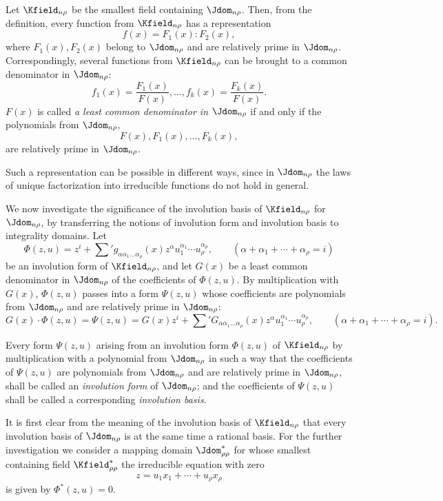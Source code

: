 \documentclass[11pt]{article}
\begin{document}
Let $\Kfield_{n\rho}$ be the smallest field containing $\Jdom_{n\rho}$. Then, from the definition, every function from $\Kfield_{n\rho}$ has a representation
\[
  f(x)=F_1(x):F_2(x),
\]
where $F_1(x),F_2(x)$ belong to $\Jdom_{n\rho}$ and are relatively prime in $\Jdom_{n\rho}$. Correspondingly, several functions from $\Kfield_{n\rho}$ can be brought to a common denominator in $\Jdom_{n\rho}$:
\[
  f_1(x)=\frac{F_1(x)}{F(x)},\ldots,
  f_k(x)=\frac{F_k(x)}{F(x)}.
\]
$F(x)$ is called \emph{a least common denominator in $\Jdom_{n\rho}$} if and only if the polynomials from $\Jdom_{n\rho}$,
\[
  F(x),F_1(x),\ldots,F_k(x),
\]
are relatively prime in $\Jdom_{n\rho}$.

Such a representation can be possible in different ways, since in $\Jdom_{n\rho}$ the laws of unique factorization into irreducible functions do not hold in general.

We now investigate the significance of the involution basis of $\Kfield_{n\rho}$ for $\Jdom_{n\rho}$, by transferring the notions of involution form and involution basis to integrality domains. Let
\[
  \Phi(z,u)=z^i+\sum{}' g_{\alpha\alpha_1\ldots\alpha_\rho}(x)
  z^\alpha u_1^{\alpha_1}\cdots u_\rho^{\alpha_\rho},
  \qquad
  (\alpha+\alpha_1+\cdots+\alpha_\rho=i)
\]
be an involution form of $\Kfield_{n\rho}$, and let $G(x)$ be a least common denominator in $\Jdom_{n\rho}$ of the coefficients of $\Phi(z,u)$. By multiplication with $G(x)$, $\Phi(z,u)$ passes into a form $\Psi(z,u)$ whose coefficients are polynomials from $\Jdom_{n\rho}$ and are relatively prime in $\Jdom_{n\rho}$:
\[
  G(x)\cdot\Phi(z,u)=\Psi(z,u)
  =G(x)z^i+
  \sum{}' G_{\alpha\alpha_1\ldots\alpha_\rho}(x)
  z^\alpha u_1^{\alpha_1}\cdots u_\rho^{\alpha_\rho},
  \qquad
  (\alpha+\alpha_1+\cdots+\alpha_\rho=i).
\]

Every form $\Psi(z,u)$ arising from an involution form $\Phi(z,u)$ of $\Kfield_{n\rho}$ by multiplication with a polynomial from $\Jdom_{n\rho}$ in such a way that the coefficients of $\Psi(z,u)$ are polynomials from $\Jdom_{n\rho}$ and are relatively prime in $\Jdom_{n\rho}$, shall be called an \emph{involution form} of $\Jdom_{n\rho}$; and the coefficients of $\Psi(z,u)$ shall be called a corresponding \emph{involution basis}.

It is first clear from the meaning of the involution basis of $\Kfield_{n\rho}$ that every involution basis of $\Jdom_{n\rho}$ is at the same time a rational basis. For the further investigation we consider a mapping domain $\Jdom^*_{\rho\rho}$ for whose smallest containing field $\Kfield^*_{\rho\rho}$ the irreducible equation with zero
\[
  z=u_1x_1+\cdots+u_\rho x_\rho
\]
is given by $\Phi^*(z,u)=0$.
\end{document}
